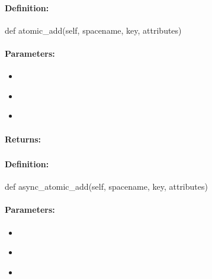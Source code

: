 \paragraph{Definition:}
\begin{pythoncode}
def atomic_add(self, spacename, key, attributes)
\end{pythoncode}

\paragraph{Parameters:}
\begin{itemize}[noitemsep]
\item {}\\

\item {}\\

\item {}\\

\end{itemize}

\paragraph{Returns:}


\pagebreak
\subsubsection{}
\label{api:python:async_atomic_add}


\paragraph{Definition:}
\begin{pythoncode}
def async_atomic_add(self, spacename, key, attributes)
\end{pythoncode}

\paragraph{Parameters:}
\begin{itemize}[noitemsep]
\item {}\\

\item {}\\

\item {}\\

\end{itemize}

